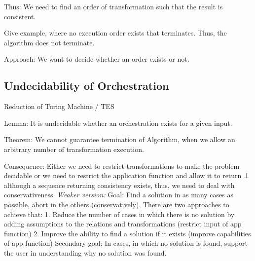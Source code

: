 Thus: We need to find an order of transformation such that the result is consistent.

Give example, where no execution order exists that terminates. Thus, the algorithm does not terminate.

Approach: We want to decide whether an order exists or not.


\subsection{Undecidability of Orchestration}

Reduction of Turing Machine / TES

Lemma: It is undecidable whether an orchestration exists for a given input.

Theorem: We cannot guarantee termination of Algorithm, when we allow an arbitrary number of transformation execution.

Consequence: Either we need to restrict transformations to make the problem decidable or we need to restrict the application function and allow it to return $\bot$ although a sequence returning consistency exists, thus, we need to deal with conservativeness.
\textit{Weaker version:}
Goal: Find a solution in as many cases as possible, abort in the others (conservatively). There are two approaches to achieve that: 
1. Reduce the number of cases in which there is no solution by adding assumptions to the relations and transformations (restrict input of app function)
2. Improve the ability to find a solution if it exists (improve capabilities of app function)
Secondary goal: In cases, in which no solution is found, support the user in understanding why no solution was found.

